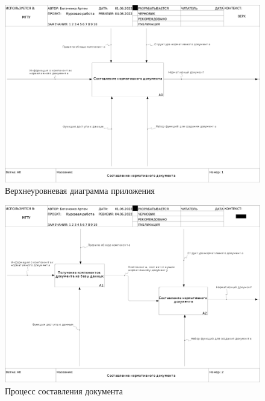 \clearpage

\begin{figure}[h!]
	\begin{center}
		\includegraphics[scale=0.22666]{inc/img/idef0.png}
	\end{center}
	\captionsetup{justification=centering}
	\caption{Верхнеуровневая диаграмма приложения}
	\label{img:idef0}
\end{figure}

\begin{figure}[h!]
	\begin{center}
		\includegraphics[scale=0.22666]{inc/img/idef0_2.png}
	\end{center}
	\captionsetup{justification=centering}
	\caption{Процесс составления документа}
	\label{img:idef0_2}
\end{figure}


